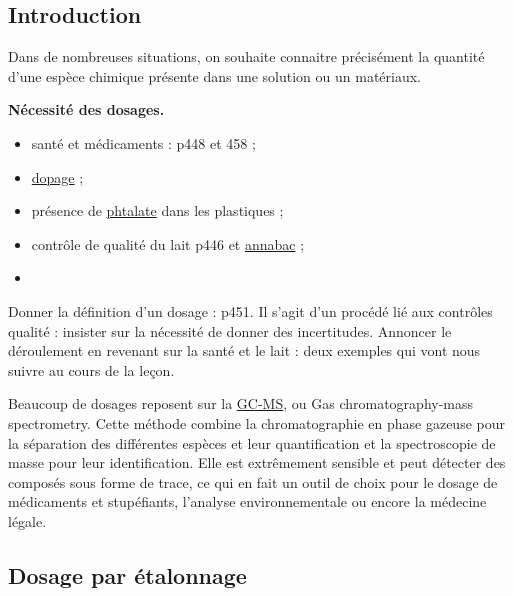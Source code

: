 \subsection*{Introduction}

Dans de nombreuses situations, on souhaite connaitre précisément la quantité d'une espèce chimique présente dans une solution ou un matériaux.

\begin{slide}
\textbf{Nécessité des dosages.}
\begin{itemize}
\item santé et médicaments : \cite{Prevost2012} p448 et 458 ;
\item \href{http://www.sfendocrino.org/article/810/poly201-item-78-ndash-ue-3-dopage}{dopage} ;
\item présence de \href{https://www.analytice.com/dosage-laboratoire-dehp-cas-117-81-7-dans-les-materiaux/}{phtalate} dans les plastiques ;
\item contrôle de qualité du lait \cite{Prevost2012} p446 et \href{https://www.annabac.com/annales-bac/controles-de-qualite-d-un-lait}{annabac} ;
\item 
\end{itemize}
\end{slide}

Donner la définition d'un dosage : \cite{Prevost2012} p451.
Il s'agit d'un procédé lié aux contrôles qualité : insister sur la nécessité de donner des incertitudes.
Annoncer le déroulement en revenant sur la santé et le lait : deux exemples qui vont nous suivre au cours de la leçon.

\begin{remarque}
Beaucoup de dosages reposent sur la  \href{https://fr.wikipedia.org/wiki/Chromatographie_en_phase_gazeuse-spectrom\%C3\%A9trie_de_masse}{GC-MS}, ou Gas chromatography-mass spectrometry.
Cette méthode combine la chromatographie en phase gazeuse pour la séparation des différentes espèces et leur quantification et la spectroscopie de masse pour leur identification.
Elle est extrêmement sensible et peut détecter des composés sous forme de trace, ce qui en fait un outil de choix pour le dosage de médicaments et stupéfiants, l'analyse environnementale ou encore la médecine légale.
\end{remarque}

\subsection{Dosage par étalonnage}

